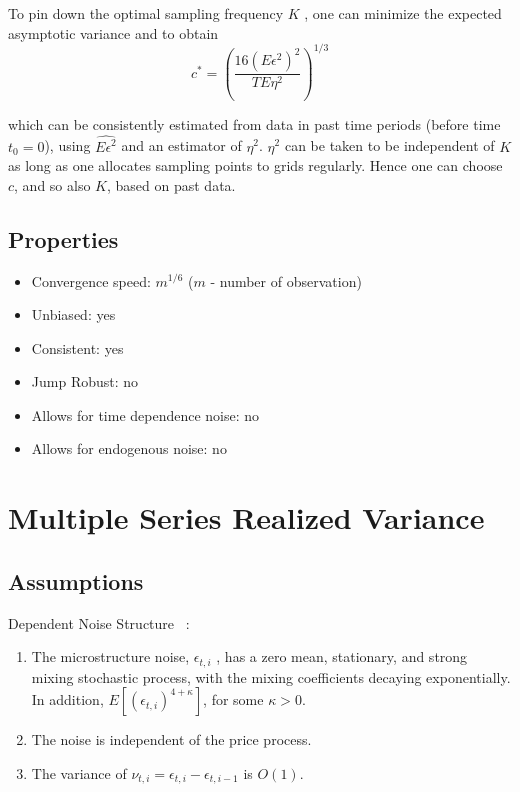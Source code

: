\documentclass[letterpaper]{report}
\newcounter{N}
\begin{document}
\noindent To pin down the optimal sampling frequency $K$ \cite[Zhang, Mykland, and Ait-Sahalia, 2005]{Zhang_Mykland_Ait-Sahalia}, one can minimize the expected asymptotic variance and to obtain
\begin{equation}
c^* = \left(\frac{16(E\epsilon^2)^2}{TE\eta^2}\right)^{1/3}
\end{equation}

\noindent which can be consistently estimated from data in past time periods
(before time $t_0 = 0$), using $\hat{E\epsilon^2}$ and an estimator of $\eta^2$. $\eta^2$ can be taken to be independent
of $K$ as long as one allocates sampling points to grids regularly. Hence one can choose $c$,
and so also $K$, based on past data.
\subsection{Properties}
\begin{itemize}
\item Convergence speed: $m^{1/6}$ ($m$ - number of observation)
\item Unbiased: yes
\item Consistent: yes
\item Jump Robust: no
\item Allows for time dependence noise: no
\item Allows for endogenous noise: no
\end{itemize}
 
 
\section{Multiple Series Realized Variance}
\subsection{Assumptions}
Dependent Noise Structure ~\cite[Podolskij and Vetter, 2009]{Podolskij_Vetter}:
\begin{enumerate}
\item The microstructure noise, $\epsilon_{t,i}$ , has a zero mean, stationary,
and strong mixing stochastic process, with the mixing coefficients decaying
exponentially. In addition, $E[(\epsilon_{t,i})^{4+\kappa}]$, for some $\kappa
>0$.
\item The noise is independent of the price process.
\item The variance of $\nu_{t,i} = \epsilon_{t,i} - \epsilon_{t,i-1}$ is $O(1)$.
\end{enumerate}
\end{document}

